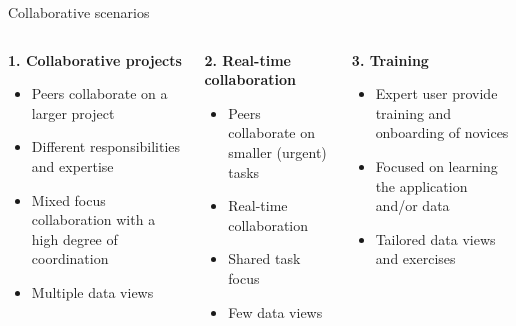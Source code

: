 \documentclass[aspectratio=169]{beamer}
\begin{document}
\begin{frame}{Collaborative scenarios}
    \setlength{\leftmargini}{0.5cm}
    \begin{columns}[t]
        \begin{column}{0.33\textwidth}
            \textbf{\small 1. Collaborative projects}
            \begin{itemize}
                \scriptsize
                \item Peers collaborate on a larger project
                \item Different responsibilities and expertise
                \item Mixed focus collaboration with a high degree of coordination
                \item Multiple data views
            \end{itemize}
        \end{column}
        \begin{column}{0.33\textwidth}
            \textbf{\small 2. Real-time collaboration}
            \begin{itemize}
                \scriptsize
                \item Peers collaborate on smaller (urgent) tasks
                \item Real-time collaboration
                \item Shared task focus 
                \item Few data views
            \end{itemize}
        \end{column}
        \begin{column}{0.33\textwidth}
            \textbf{\small 3. Training}
            \begin{itemize}
                \scriptsize
                \item Expert user provide training and onboarding of novices
                \item Focused on learning the application and/or data
                \item Tailored data views and exercises
            \end{itemize}
        \end{column}
    \end{columns}
\end{frame}
\end{document}
